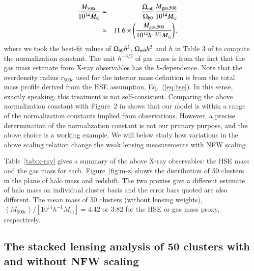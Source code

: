 \documentclass[iop, apj]{emulateapj}
\def\ave#1{\left\langle #1 \right\rangle}
\newcommand{\?}{\stackrel{?}{=}}
\begin{document}
\begin{itemize}
	\begin{eqnarray}
	 \frac{M_{\rm
	  500c}}{10^{14}M_\odot}&=&\frac{\Omega_{\rm m0}}{\Omega_{\rm
	  b0}}\frac{M_{\rm gas, 500}}{10^{14}M_\odot}\nonumber\\
	  &\simeq & 11.6\times
	 \left(\frac{M_{\rm
	  gas,500}}{10^{14}h^{-3/2}M_\odot}\right),
	 \label{eq:M500-Mgas}
	\end{eqnarray}
	where we took the best-fit values of $\Omega_{\rm b0}h^2$,
	$\Omega_{\rm m0}h^2$ and $h$ in Table 3 of
	\citet{PlanckCosmo:15} to compute the normalization constant.
	The unit $h^{-3/2}$ of gas mass is from the fact that the gas
	mass estimate from X-ray observables has the $h$-dependence.
	Note that the overdensity radius $r_{500c}$ used for the
	interior mass definition is from the total mass profile derived
	from the HSE assumption, Eq.~(\ref{eq:hse}).  In this sense,
	exactly speaking, this treatment is not self-consistent.
	Comparing the above normalization constant with Figure~2 in
	\citet{Okabeetal:14} shows that our model is within a range of
	the normalization constants implied from observations. However,
	a precise determination of the normalization constant is not our
	primary purpose, and the above choice is a working example. We
	will below study how variations in the above scaling relation
	change the weak lensing measurements with NFW scaling.
\end{itemize}
Table~\ref{tab:x-ray} gives a summary of the above X-ray observables:
the HSE mass and the gas mass for each. Figure~\ref{fig:m-z} shows the
distribution of 50 clusters in the plane of halo mass and redshift. The
two proxies give a different estimate of halo mass on individual cluster
basis and the error bars quoted are also different.
The mean mass of 50 clusters (without lensing weights),
$\ave{M_{500c}}/[10^{14}h^{-1}M_\odot]=4.42$ or 3.82 for the HSE or gas
mass proxy, respectively.


\subsection{The stacked lensing analysis of 50 clusters with and
 without NFW scaling}
\label{sec:fnfw}
 
\end{document}
